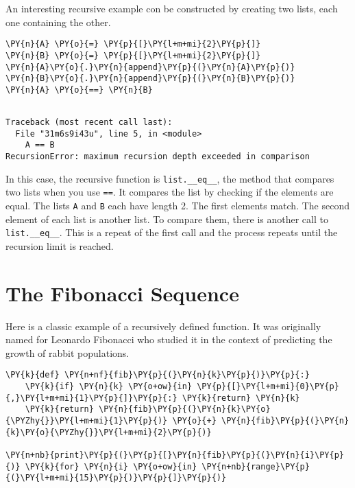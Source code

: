An interesting recursive example con be constructed by creating two lists, each one containing the other.


\begin{Verbatim}[commandchars=\\\{\}]
\PY{n}{A} \PY{o}{=} \PY{p}{[}\PY{l+m+mi}{2}\PY{p}{]}
\PY{n}{B} \PY{o}{=} \PY{p}{[}\PY{l+m+mi}{2}\PY{p}{]}
\PY{n}{A}\PY{o}{.}\PY{n}{append}\PY{p}{(}\PY{n}{A}\PY{p}{)}
\PY{n}{B}\PY{o}{.}\PY{n}{append}\PY{p}{(}\PY{n}{B}\PY{p}{)}
\PY{n}{A} \PY{o}{==} \PY{n}{B}
\end{Verbatim}

\begin{Verbatim}

Traceback (most recent call last):
  File "31m6s9i43u", line 5, in <module>
    A == B
RecursionError: maximum recursion depth exceeded in comparison

\end{Verbatim}


In this case, the recursive function is \texttt{list.\_\_eq\_\_}, the method that compares two lists when you use \texttt{==}.  It compares the list by checking if the elements are equal.  The lists \texttt{A} and \texttt{B} each have length 2.  The first elements match.  The second element of each list is another list.  To compare them, there is another call to \texttt{list.\_\_eq\_\_}.  This is a repeat of the first call and the process repeats until the recursion limit is reached.

\section{The Fibonacci Sequence}


Here is a classic example of a recursively defined function.
It was originally named for Leonardo Fibonacci who studied it in the context of predicting the growth of rabbit populations.


\begin{Verbatim}[commandchars=\\\{\}]
\PY{k}{def} \PY{n+nf}{fib}\PY{p}{(}\PY{n}{k}\PY{p}{)}\PY{p}{:}
    \PY{k}{if} \PY{n}{k} \PY{o+ow}{in} \PY{p}{[}\PY{l+m+mi}{0}\PY{p}{,}\PY{l+m+mi}{1}\PY{p}{]}\PY{p}{:} \PY{k}{return} \PY{n}{k}
    \PY{k}{return} \PY{n}{fib}\PY{p}{(}\PY{n}{k}\PY{o}{\PYZhy{}}\PY{l+m+mi}{1}\PY{p}{)} \PY{o}{+} \PY{n}{fib}\PY{p}{(}\PY{n}{k}\PY{o}{\PYZhy{}}\PY{l+m+mi}{2}\PY{p}{)}

\PY{n+nb}{print}\PY{p}{(}\PY{p}{[}\PY{n}{fib}\PY{p}{(}\PY{n}{i}\PY{p}{)} \PY{k}{for} \PY{n}{i} \PY{o+ow}{in} \PY{n+nb}{range}\PY{p}{(}\PY{l+m+mi}{15}\PY{p}{)}\PY{p}{]}\PY{p}{)}
\end{Verbatim}

